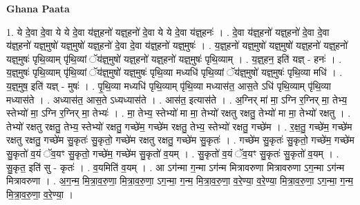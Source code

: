 \documentclass[17pt]{extarticle}
\begin{document}
\textbf{Ghana Paata } \newline

1. ये दे॒वा दे॒वा ये ये दे॒वा य॑ज्ञ्॒हनो॑ यज्ञ्॒हनो॑ दे॒वा ये ये दे॒वा य॑ज्ञ्॒हनः॑ । . दे॒वा य॑ज्ञ्॒हनो॑ यज्ञ्॒हनो॑ दे॒वा दे॒वा य॑ज्ञ्॒हनो॑ यज्ञ्॒मुषो॑ यज्ञ्॒मुषो॑ यज्ञ्॒हनो॑ दे॒वा दे॒वा य॑ज्ञ्॒हनो॑ यज्ञ्॒मुषः॑ । . य॒ज्ञ्॒हनो॑ यज्ञ्॒मुषो॑ यज्ञ्॒मुषो॑ यज्ञ्॒हनो॑ यज्ञ्॒हनो॑ यज्ञ्॒मुषः॑ पृथि॒व्याम् पृ॑थि॒व्यां ॅय॑ज्ञ्॒मुषो॑ यज्ञ्॒हनो॑ यज्ञ्॒हनो॑ यज्ञ्॒मुषः॑ पृथि॒व्याम् । . य॒ज्ञ्॒हन॒ इति॑ यज्ञ् - हनः॑ । . य॒ज्ञ्॒मुषः॑ पृथि॒व्याम् पृ॑थि॒व्यां ॅय॑ज्ञ्॒मुषो॑ यज्ञ्॒मुषः॑ पृथि॒व्या मध्यधि॑ पृथि॒व्यां ॅय॑ज्ञ्॒मुषो॑ यज्ञ्॒मुषः॑ पृथि॒व्या मधि॑ । . य॒ज्ञ्॒मुष॒ इति॑ यज्ञ् - मुषः॑ । . पृ॒थि॒व्या मध्यधि॑ पृथि॒व्याम् पृ॑थि॒व्या मध्यास॑त॒ आस॒ते ऽधि॑ पृथि॒व्याम् पृ॑थि॒व्या मध्यास॑ते । . अध्यास॑त॒ आस॒ते ऽध्यध्यास॑ते । . आस॑त॒ इत्यास॑ते । . अ॒ग्निर् मा॑ मा॒ ऽग्नि र॒ग्निर् मा॒ तेभ्य॒ स्तेभ्यो॑ मा॒ ऽग्नि र॒ग्निर् मा॒ तेभ्यः॑ । . मा॒ तेभ्य॒ स्तेभ्यो॑ मा मा॒ तेभ्यो॑ रक्षतु रक्षतु॒ तेभ्यो॑ मा मा॒ तेभ्यो॑ रक्षतु । . तेभ्यो॑ रक्षतु रक्षतु॒ तेभ्य॒ स्तेभ्यो॑ रक्षतु॒ गच्छे॑म॒ गच्छे॑म रक्षतु॒ तेभ्य॒ स्तेभ्यो॑ रक्षतु॒ गच्छे॑म । . र॒क्ष॒तु॒ गच्छे॑म॒ गच्छे॑म रक्षतु रक्षतु॒ गच्छे॑म सु॒कृतः॑ सु॒कृतो॒ गच्छे॑म रक्षतु रक्षतु॒ गच्छे॑म सु॒कृतः॑ । . गच्छे॑म सु॒कृतः॑ सु॒कृतो॒ गच्छे॑म॒ गच्छे॑म सु॒कृतो॑ व॒यं ॅव॒यꣳ सु॒कृतो॒ गच्छे॑म॒ गच्छे॑म सु॒कृतो॑ व॒यम् । . सु॒कृतो॑ व॒यं ॅव॒यꣳ सु॒कृतः॑ सु॒कृतो॑ व॒यम् । . सु॒कृत॒ इति॑ सु - कृतः॑ । . व॒यमिति॑ व॒यम् । . आ ऽग॑न्मा ग॒न्मा ऽग॑न्म मित्रावरुणा मित्रावरुणा ऽग॒न्मा ऽग॑न्म मित्रावरुणा । . अ॒ग॒न्म॒ मि॒त्रा॒व॒रु॒णा॒ मि॒त्रा॒व॒रु॒णा॒ ऽग॒न्मा॒ ग॒न्म॒ मि॒त्रा॒व॒रु॒णा॒ व॒रे॒ण्या॒ व॒रे॒ण्या॒ मि॒त्रा॒व॒रु॒णा॒ ऽग॒न्मा॒ ग॒न्म॒ मि॒त्रा॒व॒रु॒णा॒ व॒रे॒ण्या॒ । \newline
\end{document}

